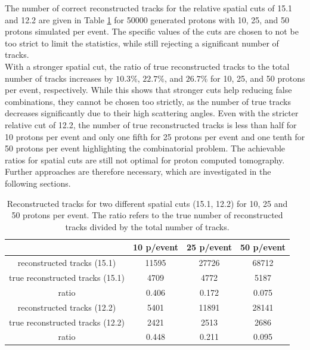 The number of correct reconstructed tracks for the relative spatial cuts of 15.1 and 12.2 are given in Table
\ref{tab:true_tracks} for 50000 generated protons with 10,
25, and 50 protons simulated per event. The specific values of the cuts are chosen to not be too strict to limit the statistics, while still rejecting a significant number
of tracks.\\
With a stronger spatial cut,  the ratio of true reconstructed tracks to
the total number of tracks increases by $10.3\%$, $22.7\%$, and $26.7\%$ for 10, 25, and 50 protons per event, respectively.
While this shows that stronger cuts help reducing false combinations, they cannot be chosen too strictly,
as the number of true tracks decreases significantly due to their high scattering angles. Even with the stricter relative cut of 12.2, the
number of true reconstructed tracks is less than half for 10 protons per event and only one fifth for 25 protons per event and one tenth for 50 protons per event highlighting the combinatorial problem. The achievable ratios for spatial cuts are still not optimal for proton computed tomography.
Further approaches are therefore necessary, which are investigated in the following sections.

\begin{table}
  \centering
  \caption{Reconstructed tracks for two different spatial cuts (15.1, 12.2) for 10, 25 and 50 protons per event. The ratio refers to the true
  number of reconstructed tracks divided by the total number of tracks.}
  \begin{tabular}{c | c c c}
    \toprule
     & 10 p/event & 25 p/event & 50 p/event \\
    \midrule
    reconstructed tracks (15.1) & 11595 & 27726 & 68712  \\
    true reconstructed tracks (15.1) & 4709 & 4772  & 5187 \\
    ratio & 0.406 & 0.172 & 0.075 \\
    \midrule
    reconstructed tracks (12.2) & 5401 & 11891 & 28141 \\
    true reconstructed tracks (12.2) &  2421 &2513  & 2686 \\
    ratio & 0.448 & 0.211 & 0.095
  \end{tabular}
  \label{tab:true_tracks}
\end{table}


